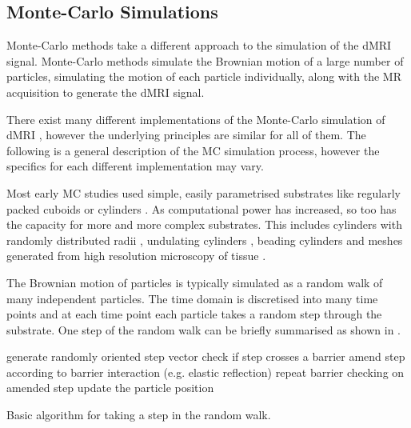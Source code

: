 \subsection{Monte-Carlo Simulations}
\label{sec:montecarlo}
Monte-Carlo methods take a different approach to the simulation of the \ac{dMRI} signal. Monte-Carlo methods simulate the Brownian motion of a large number of particles, simulating the motion of each particle individually, along with the MR acquisition to generate the \ac{dMRI} signal.

There exist many different implementations of the Monte-Carlo simulation of \ac{dMRI} \cite{Yeh2013,Nilsson2012,Landman2010,Balls2009,Hall2009,Ford1997,Szafer1995}, however the underlying principles are similar for all of them. The following is a general description of the \ac{MC} simulation process, however the specifics for each different implementation may vary. 



Most early \ac{MC} studies used simple, easily parametrised substrates like regularly packed cuboids \cite{Szafer1995} or cylinders \cite{Ford1997}.
As computational power has increased, so too has the capacity for more and more complex substrates.
This includes cylinders with randomly distributed radii \cite{Hall2009}, undulating  cylinders \cite{Nilsson2012}, beading cylinders \cite{Budde2010} and meshes generated from high resolution microscopy of tissue \cite{Panagiotaki2010}.

The Brownian motion of particles is typically simulated as a random walk of many independent particles. The time domain is discretised into many time points and at each time point each particle takes a random step through the substrate.  
One step of the random walk can be briefly summarised as shown in .
\begin{algorithm}
  \begin{algorithmic}
    \State generate randomly oriented step vector
    \State check if step crosses a barrier 
    \State amend step according to barrier interaction (e.g. elastic reflection)
    \State repeat barrier checking on amended step
    \EndWhile
    \State update the particle position 
  \end{algorithmic}
  \caption{Basic algorithm for taking a step in the random walk.}
  \label{alg:MC_random_walk}
\end{algorithm}
 
